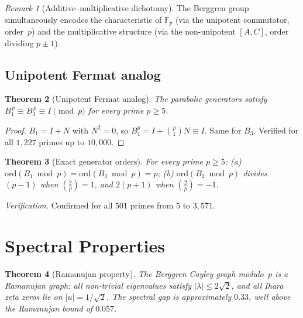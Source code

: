 \documentclass[12pt]{amsart}
\newtheorem{theorem}{Theorem}[section]
\theoremstyle{definition}
\theoremstyle{remark}
\newtheorem{remark}[theorem]{Remark}
\begin{document}
\begin{remark}[Additive--multiplicative dichotomy]
The Berggren group simultaneously encodes the characteristic
of $\mathbb{F}_p$ (via the unipotent commutator, order~$p$) and the
multiplicative structure (via the non-unipotent $[A,C]$, order dividing
$p \pm 1$).
\end{remark}

\subsection{Unipotent Fermat analog}

\begin{theorem}[Unipotent Fermat analog]\label{thm:unipotent-fermat}
The parabolic generators satisfy $B_1^{\,p} \equiv B_3^{\,p} \equiv I \pmod{p}$
for every prime $p \ge 5$.
\end{theorem}

\begin{proof}
$B_1 = I + N$ with $N^2 = 0$, so $B_1^p = I + \binom{p}{1}N \equiv I$. Same
for $B_3$. Verified for all $1{,}227$ primes up to $10{,}000$.
\end{proof}

\begin{theorem}[Exact generator orders]\label{thm:gen-orders}
For every prime $p \ge 5$: (a) $\mathrm{ord}(B_1 \bmod p) = \mathrm{ord}(B_3 \bmod p) = p$;
(b) $\mathrm{ord}(B_2 \bmod p)$ divides $(p-1)$ when $(\frac{2}{p}) = 1$,
and $2(p+1)$ when $(\frac{2}{p}) = -1$.
\end{theorem}

\noindent
\textit{Verification.} Confirmed for all $501$ primes from $5$ to $3{,}571$.


\section{Spectral Properties}\label{sec:spectral}

\begin{theorem}[Ramanujan property]\label{thm:ramanujan}
The Berggren Cayley graph modulo~$p$ is a Ramanujan graph: all non-trivial
eigenvalues satisfy $|\lambda| \le 2\sqrt{2}$, and all Ihara zeta zeros lie
on $|u| = 1/\sqrt{2}$. The spectral gap is approximately $0.33$, well above
the Ramanujan bound of $0.057$.
\end{theorem}
\end{document}
